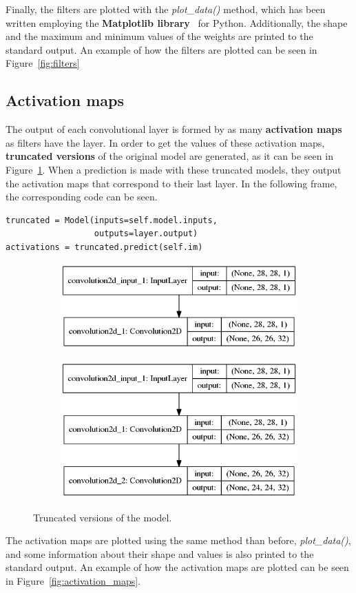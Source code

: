 Finally, the filters are plotted with the \textit{plot\_data()} method, which has been written employing the \textbf{Matplotlib library}~\cite{Hunter:2007} for Python. Additionally, the shape and the maximum and minimum values of the weights are printed to the standard output. An example of how the filters are plotted can be seen in Figure~\ref{fig:filters}

\subsection{Activation maps}
The output of each convolutional layer is formed by as many \textbf{activation maps} as filters have the layer. In order to get the values of these activation maps, \textbf{truncated versions} of the original model are generated, as it can be seen in Figure~\ref{fig:truncated}. When a prediction is made with these truncated models, they output the activation maps that correspond to their last layer. In the following frame, the corresponding code can be seen.

\begin{lstlisting}
truncated = Model(inputs=self.model.inputs,
                  outputs=layer.output)
activations = truncated.predict(self.im)
\end{lstlisting}

\begin{figure}
	\begin{subfigure}{0.5\textwidth}
		\centering
		\includegraphics[width=0.9\linewidth]{figures/1stconvarch.png}
		\caption{}
	\end{subfigure}
	\begin{subfigure}{0.5\textwidth}
		\centering
		\includegraphics[width=0.9\linewidth]{figures/2ndconvarch.png}
		\caption{}
	\end{subfigure}
	\caption{Truncated versions of the model.}
	\label{fig:truncated}
\end{figure}

The activation maps are plotted using the same method than before, \textit{plot\_data()}, and some information about their shape and values is also printed to the standard output. An example of how the activation maps are plotted can be seen in Figure~\ref{fig:activation_maps}.
